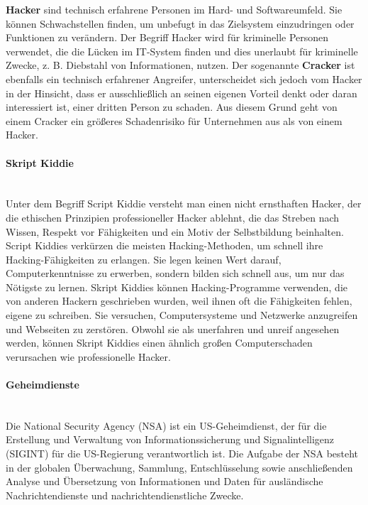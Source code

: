 \textbf{Hacker} sind technisch erfahrene Personen im Hard- und Softwareumfeld. Sie können Schwachstellen finden, um unbefugt in das Zielsystem einzudringen oder Funktionen zu verändern\cite{hack17}. Der Begriff Hacker wird für kriminelle Personen verwendet, die die Lücken im IT-System finden und dies unerlaubt für kriminelle Zwecke, z. B. Diebstahl von Informationen, nutzen\cite{hack11}.  Der sogenannte \textbf{Cracker} ist ebenfalls ein technisch erfahrener Angreifer, unterscheidet sich jedoch vom Hacker in der Hinsicht, dass er ausschließlich an seinen eigenen Vorteil denkt oder daran interessiert ist, einer dritten Person zu schaden. Aus diesem Grund geht von einem Cracker ein größeres Schadenrisiko für Unternehmen aus als von einem Hacker\cite[45]{eckert2013sicherheit}.

\paragraph{Skript Kiddie}\mbox{}\\

Unter dem Begriff Script Kiddie versteht man einen nicht ernsthaften Hacker, der die ethischen Prinzipien professioneller Hacker ablehnt, die das Streben nach Wissen, Respekt vor Fähigkeiten und ein Motiv der Selbstbildung beinhalten. Script Kiddies verkürzen die meisten Hacking-Methoden, um schnell ihre Hacking-Fähigkeiten zu erlangen. Sie legen keinen Wert darauf, Computerkenntnisse zu erwerben, sondern bilden sich schnell aus, um nur das Nötigste zu lernen. Skript Kiddies können Hacking-Programme verwenden, die von anderen Hackern geschrieben wurden, weil ihnen oft die Fähigkeiten fehlen, eigene zu schreiben. Sie versuchen, Computersysteme und Netzwerke anzugreifen und Webseiten zu zerstören. Obwohl sie als unerfahren und unreif angesehen werden, können Skript Kiddies einen ähnlich großen Computerschaden verursachen wie professionelle Hacker\cite{scriptkiddie11}.

\paragraph{Geheimdienste}\mbox{}\\

Die National Security Agency (NSA) ist ein US-Geheimdienst, der für die Erstellung und Verwaltung von Informationssicherung und Signalintelligenz (SIGINT) für die US-Regierung verantwortlich ist. Die Aufgabe der NSA besteht in der globalen Überwachung, Sammlung, Entschlüsselung sowie anschließenden Analyse und Übersetzung von Informationen und Daten für ausländische Nachrichtendienste und nachrichtendienstliche Zwecke\cite{nsa14}.

